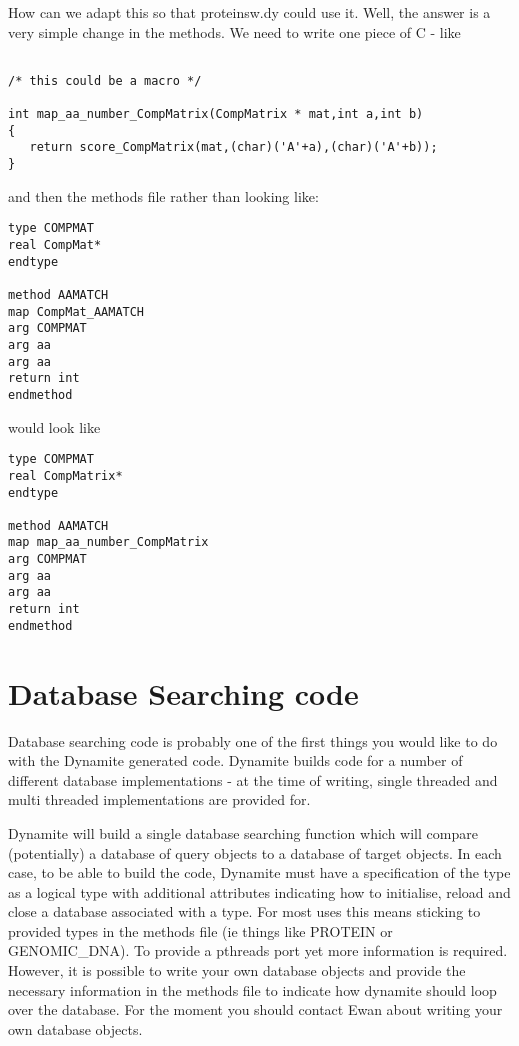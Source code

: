 How can we adapt this so that proteinsw.dy could use it. Well, the 
answer is a very simple change in the methods. We need to write
one piece of C - like

\begin{verbatim}

/* this could be a macro */

int map_aa_number_CompMatrix(CompMatrix * mat,int a,int b)
{
   return score_CompMatrix(mat,(char)('A'+a),(char)('A'+b));
}
\end{verbatim}

and then the methods file rather than looking like:

\begin{verbatim}
type COMPMAT
real CompMat*
endtype

method AAMATCH
map CompMat_AAMATCH
arg COMPMAT
arg aa
arg aa
return int
endmethod
\end{verbatim}

would look like

\begin{verbatim}
type COMPMAT
real CompMatrix*
endtype

method AAMATCH
map map_aa_number_CompMatrix
arg COMPMAT
arg aa
arg aa
return int
endmethod
\end{verbatim}

\section{Database Searching code}

Database searching code is probably one of the first things you
would like to do with the Dynamite generated code. Dynamite builds
code for a number of different database implementations - at the
time of writing, single threaded and multi threaded implementations
are provided for.

Dynamite will build a single database searching function which will
compare (potentially) a database of query objects to a database of
target objects. In each case, to be able to build the code, Dynamite
must have a specification of the type as a logical type with additional
attributes indicating how to initialise, reload and close a database
associated with a type. For most uses this means sticking to provided
types in the methods file (ie things like PROTEIN or GENOMIC\_DNA). To
provide a pthreads port yet more information is required. However,
it is possible to write your own database objects and provide the necessary
information in the methods file to indicate how dynamite should loop over the
database. For the moment you should contact Ewan about writing your own
database objects.


